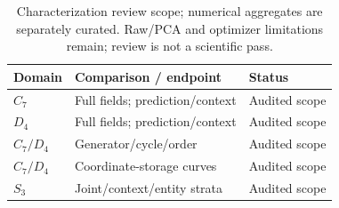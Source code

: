 \begin{table}[t]
\centering\footnotesize
\caption{Characterization review scope; numerical aggregates are separately curated. Raw/PCA and optimizer limitations remain; review is not a scientific pass.}
\label{tab:prospective}
\setlength{\tabcolsep}{3pt}
\begin{tabular}{lll}
\toprule Domain & Comparison / endpoint & Status \\
\midrule
$C_7$ & Full fields; prediction/context & Audited scope \\
$D_4$ & Full fields; prediction/context & Audited scope \\
$C_7/D_4$ & Generator/cycle/order & Audited scope \\
$C_7/D_4$ & Coordinate-storage curves & Audited scope \\
$S_3$ & Joint/context/entity strata & Audited scope \\
\bottomrule
\end{tabular}
\end{table}
